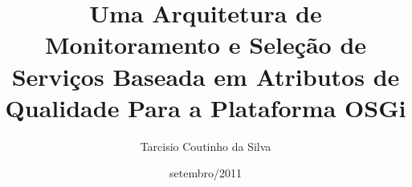 \documentclass[pt,a4paper,bsc,oneside,onehalfspacing]{risethesis}
\title{Uma Arquitetura de Monitoramento e Seleç\~ao de Serviços Baseada em Atributos de Qualidade Para a Plataforma OSGi}
\date{setembro/2011}
\author{Tarcisio Coutinho da Silva}
\begin{document}
\frontmatter
\presentationpage

\mainmatter
\tableofcontents

\end{document}
